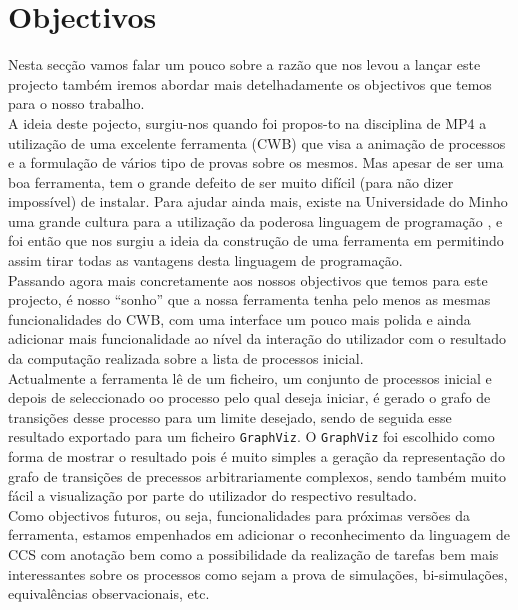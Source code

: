 

\section{Objectivos}
Nesta secção vamos falar um pouco sobre a razão que nos levou a lançar este projecto também iremos abordar mais detelhadamente  os objectivos que temos para o nosso trabalho.\\
A ideia deste pojecto, surgiu-nos quando foi propos-to na disciplina de MP4 a utilização de uma excelente ferramenta (\textsf{CWB}) que visa a animação de processos e a formulação de vários tipo de provas sobre os mesmos. Mas apesar de ser uma boa ferramenta, tem o grande defeito de ser muito difícil (para não dizer impossível) de instalar. Para ajudar ainda mais, existe na Universidade do Minho uma grande cultura para a utilização da poderosa linguagem de programação \haskell, e foi então que nos surgiu a ideia da construção de uma ferramenta em \haskell permitindo assim tirar todas as vantagens desta linguagem de programação.\\
Passando agora mais concretamente aos nossos objectivos que temos para este projecto, é nosso ``sonho'' que a nossa ferramenta tenha pelo menos as mesmas funcionalidades do \textsf{CWB}, com uma interface um pouco mais polida e ainda adicionar mais funcionalidade ao nível da interação do utilizador com o resultado da computação realizada sobre a lista de processos inicial.\\
Actualmente a ferramenta lê de um ficheiro, um conjunto de processos inicial e depois de seleccionado oo processo pelo qual deseja iniciar, é gerado o grafo de transições desse processo para um limite desejado, sendo de seguida esse resultado exportado para um ficheiro \texttt{GraphViz}. O  \texttt{GraphViz} foi escolhido como forma de mostrar o resultado pois é muito simples a geração da representação do grafo de transições de precessos arbitrariamente complexos, sendo também muito fácil a visualização por parte do utilizador do respectivo resultado.\\
Como objectivos futuros, ou seja, funcionalidades para próximas versões da ferramenta, estamos empenhados em adicionar o reconhecimento da linguagem de {\textsf{CCS}} com anotação bem como a possibilidade da realização de tarefas bem mais interessantes sobre os processos como sejam a prova de simulações, bi-simulações, equivalências observacionais, etc.

